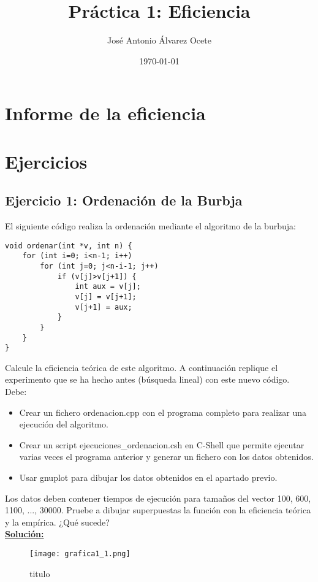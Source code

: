 \documentclass[11pt,a4paper]{article}
\title{Práctica 1: Eficiencia}
\author{José Antonio Álvarez Ocete}
\date{\today}
\begin{document}
\maketitle

\section{Informe de la eficiencia}

\section{Ejercicios}

\subsection{Ejercicio 1: Ordenación de la Burbja}
El siguiente código realiza la ordenación mediante el algoritmo de la burbuja:
\begin{lstlisting}
void ordenar(int *v, int n) {
	for (int i=0; i<n-1; i++)
		for (int j=0; j<n-i-1; j++)
			if (v[j]>v[j+1]) {
				int aux = v[j];
				v[j] = v[j+1];
				v[j+1] = aux;
			}
		}
	}
}
\end{lstlisting}
Calcule la eficiencia teórica de este algoritmo. A continuación replique el experimento que se ha hecho antes (búsqueda lineal) con este nuevo código. Debe:
\begin{itemize}
	\item Crear un fichero ordenacion.cpp con el programa completo para realizar una ejecución del algoritmo.
	\item Crear un script ejecuciones\_ordenacion.csh en C-Shell que permite ejecutar varias veces el programa anterior y generar un fichero con los datos obtenidos.
	\item Usar gnuplot para dibujar los datos obtenidos en el apartado previo.
\end{itemize}
Los datos deben contener tiempos de ejecución para tamaños del vector 100, 600, 1100, ...,
30000.
Pruebe a dibujar superpuestas la función con la eficiencia teórica y la empírica. ¿Qué
sucede? \\

\textbf{\underline{Solución:}}

\begin{figure}[H]
	\caption{titulo}
	\centering
	\texttt{[image: grafica1\_1.png]}

\end{figure}
\end{document}
